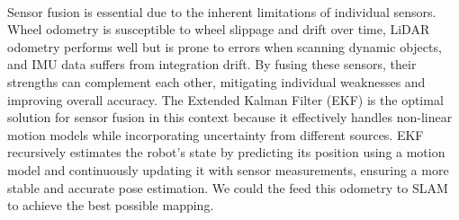 \paragraph*{}
Sensor fusion is essential due to the inherent limitations of individual sensors. Wheel odometry is susceptible to wheel slippage and drift over time, LiDAR odometry performs well but is prone to errors when scanning dynamic objects, and IMU data suffers from integration drift. By fusing these sensors, their strengths can complement each other, mitigating individual weaknesses and improving overall accuracy. The Extended Kalman Filter (EKF) is the optimal solution for sensor fusion in this context because it effectively handles non-linear motion models while incorporating uncertainty from different sources. EKF recursively estimates the robot’s state by predicting its position using a motion model and continuously updating it with sensor measurements, ensuring a more stable and accurate pose estimation. We could the feed this odometry to SLAM to achieve the best possible mapping.
